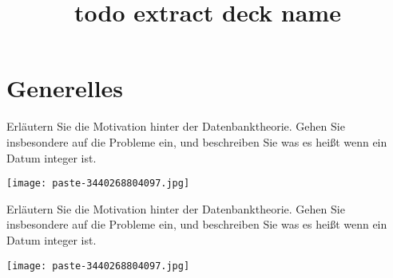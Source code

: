\documentclass{article}
\title{todo extract deck name}
\begin{document}
\section{Generelles}
\begin{tcolorbox}[colback=white!10!white,colframe=lightgray!75!black,
  savelowerto=\jobname_ex.tex]

\begin{center}
 Erläutern Sie die Motivation hinter der Datenbanktheorie. Gehen Sie insbesondere auf die 
Probleme
 ein, und beschreiben Sie was es heißt wenn ein Datum 
integer
ist. 

\end{center}

\tcblower

\justifying
\texttt{[image: paste-3440268804097.jpg]}
\end{tcolorbox}
\begin{tcolorbox}[colback=white!10!white,colframe=lightgray!75!black,
  savelowerto=\jobname_ex.tex]

\begin{center}
 Erläutern Sie die Motivation hinter der Datenbanktheorie. Gehen Sie insbesondere auf die 
Probleme
 ein, und beschreiben Sie was es heißt wenn ein Datum 
integer
ist. 

\end{center}

\tcblower

\justifying
\texttt{[image: paste-3440268804097.jpg]}
\end{tcolorbox}
\end{document}
